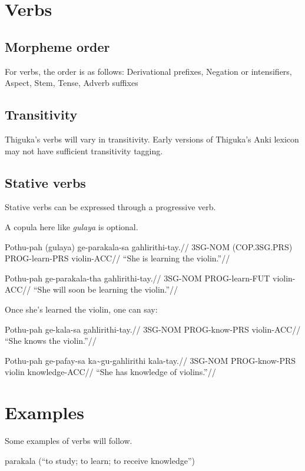 

\section{Verbs}
\subsection{Morpheme order}
For verbs, the order is as follows: Derivational prefixes, Negation or intensifiers, Aspect, Stem, Tense, Adverb suffixes

\subsection{Transitivity}
Thiguka's verbs will vary in transitivity. Early versions of Thiguka's Anki lexicon may not have sufficient transitivity tagging.

\subsection{Stative verbs}
Stative verbs can be expressed through a progressive verb.

A copula here like \textit{gulaya} is optional.

\ex
\begingl
    \gla Pothu-pah (gulaya)      ge-parakala-sa gahlirithi-tay.//
    \glb 3SG-NOM   (COP.3SG.PRS) PROG-learn-PRS violin-ACC//
    \glft ``She is learning the violin.''//
\endgl
\xe

\ex
\begingl
    \gla Pothu-pah ge-parakala-tha gahlirithi-tay.//
    \glb 3SG-NOM   PROG-learn-FUT violin-ACC//
    \glft ``She will soon be learning the violin.''//
\endgl
\xe

Once she's learned the violin, one can say:

\ex
\begingl
    \gla Pothu-pah ge-kala-sa    gahlirithi-tay.//
    \glb 3SG-NOM   PROG-know-PRS violin-ACC//
    \glft ``She knows the violin.''//
\endgl
\xe

\ex
\begingl
    \gla Pothu-pah ge-pafay-sa    ka\~{}gu-gahlirithi kala-tay.//
    \glb 3SG-NOM   PROG-know-PRS \agradj{}violin knowledge-ACC//
    \glft ``She has knowledge of violins.''//
\endgl
\xe


\section{Examples}
Some examples of verbs will follow.

parakala (``to study; to learn; to receive knowledge'')


